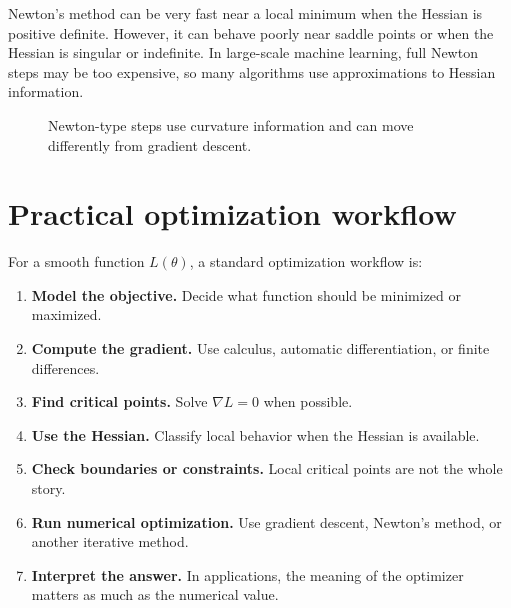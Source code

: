 \documentclass[11pt]{article}
\newcommand{\grad}{\nabla}
\begin{document}
Newton's method can be very fast near a local minimum when the Hessian is positive definite. However, it can behave poorly near saddle points or when the Hessian is singular or indefinite. In large-scale machine learning, full Newton steps may be too expensive, so many algorithms use approximations to Hessian information.

\begin{figure}[H]
\centering
{}
\caption{Newton-type steps use curvature information and can move differently from gradient descent.}
\end{figure}

\section{Practical optimization workflow}

For a smooth function $L(\theta)$, a standard optimization workflow is:
\begin{enumerate}
  \item \textbf{Model the objective.} Decide what function should be minimized or maximized.
  \item \textbf{Compute the gradient.} Use calculus, automatic differentiation, or finite differences.
  \item \textbf{Find critical points.} Solve $\grad L=0$ when possible.
  \item \textbf{Use the Hessian.} Classify local behavior when the Hessian is available.
  \item \textbf{Check boundaries or constraints.} Local critical points are not the whole story.
  \item \textbf{Run numerical optimization.} Use gradient descent, Newton's method, or another iterative method.
  \item \textbf{Interpret the answer.} In applications, the meaning of the optimizer matters as much as the numerical value.
\end{enumerate}
\end{document}
